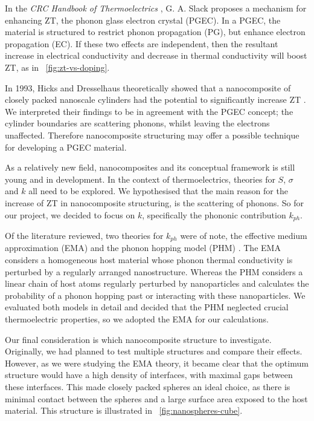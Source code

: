 \documentclass[12pt]{article}
\newcommand{\figref}[2][\figurename~]{#1\ref{#2}}
\begin{document}
In the \emph{CRC Handbook of Thermoelectrics} \cite{crc-handbook}, G. A. Slack proposes a mechanism for enhancing ZT, the phonon glass electron crystal (PGEC). In a PGEC, the material is structured to restrict phonon propagation (PG), but enhance electron propagation (EC). If these two effects are independent, then the resultant increase in electrical conductivity and decrease in thermal conductivity will boost ZT, as in \figref{fig:zt-vs-doping}.

In 1993, Hicks and Dresselhaus theoretically showed that a nanocomposite of closely packed nanoscale cylinders had the potential to significantly increase ZT \cite{nanowires}. We interpreted their findings to be in agreement with the PGEC concept; the cylinder boundaries are scattering phonons, whilst leaving the electrons unaffected. Therefore nanocomposite structuring may offer a possible technique for developing a PGEC material.

As a relatively new field, nanocomposites and its conceptual framework is still young and in development. In the context of thermoelectrics, theories for $S$, $\sigma$ and $k$ all need to be explored. We hypothesised that the main reason for the increase of ZT in nanocomposite structuring, is the scattering of phonons. So for our project, we decided to focus on $k$, specifically the phononic contribution $k_{ph}$. 

Of the literature reviewed, two theories for $k_{ph}$ were of note, the effective medium approximation (EMA) \cite{ema} and the phonon hopping model (PHM) \cite{phm}. The EMA considers a homogeneous host material whose phonon thermal conductivity is perturbed by a regularly arranged nanostructure. Whereas the PHM considers a linear chain of host atoms regularly perturbed by nanoparticles and calculates the probability of a phonon hopping past or interacting with these nanoparticles. We evaluated both models in detail and decided that the PHM neglected crucial thermoelectric properties, so we adopted the EMA for our calculations.

Our final consideration is which nanocomposite structure to investigate. Originally, we had planned to test multiple structures and compare their effects. However, as we were studying the EMA theory, it became clear that the optimum structure would have a high density of interfaces, with maximal gaps between these interfaces. This made closely packed spheres an ideal choice, as there is minimal contact between the spheres and a large surface area exposed to the host material. This structure is illustrated in \figref{fig:nanospheres-cube}.
\end{document}
